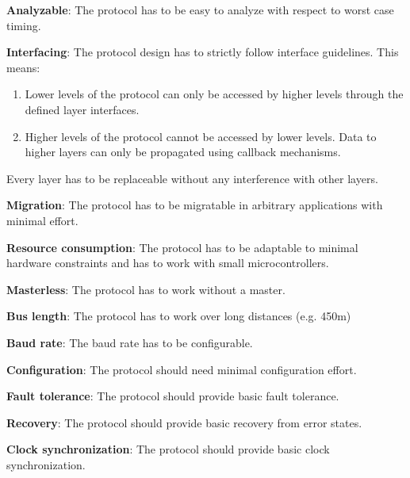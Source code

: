 \begin{req}
\label{req:ulftrtp:analyzeable}
\textbf{Analyzable}: The protocol has to be easy to analyze with respect to worst case timing.
\end{req}

\begin{req}
\label{req:ulftrtp:interfacing}
\textbf{Interfacing}: The protocol design has to strictly follow interface guidelines. This means:
\begin{enumerate}
 \item Lower levels of the protocol can only be accessed by higher levels through the defined layer interfaces.
 \item Higher levels of the protocol cannot be accessed by lower levels. Data to higher layers can only be propagated 
using callback mechanisms. 
\end{enumerate}
Every layer has to be replaceable without any interference with other layers.
\end{req}

\begin{req}
\label{req:ulftrtp:easy migration}
\textbf{Migration}: The protocol has to be migratable in arbitrary applications with minimal effort.
\end{req}

\begin{req}
\label{req:ulftrtp:resource consumption}
\textbf{Resource consumption}: The protocol has to be adaptable to minimal hardware constraints and has to work 
 with small microcontrollers.
\end{req}

\begin{req}
\label{req:ulftrtp:masterless}
\textbf{Masterless}: The protocol has to work without a master.
\end{req}

\begin{req}
\label{req:ulftrtp:length}
\textbf{Bus length}: The protocol has to work over long distances (e.g. 450m)
\end{req}

\begin{req}
\label{req:ulftrtp:baudrate}
\textbf{Baud rate}: The baud rate has to be configurable.
\end{req}

\begin{req}
\label{req:ulftrtp:configuration}
\textbf{Configuration}: The protocol should need minimal configuration effort.
\end{req}

\begin{req}
\label{req:ulftrtp:ft}
\textbf{Fault tolerance}: The protocol should provide basic fault tolerance.
\end{req}

\begin{req}
\label{req:ulftrtp:recovery}
\textbf{Recovery}: The protocol should provide basic recovery from error states.
\end{req}

\begin{req}
\label{req:ulftrtp:clocksync}
\textbf{Clock synchronization}: The protocol should provide basic clock synchronization.
\end{req}

